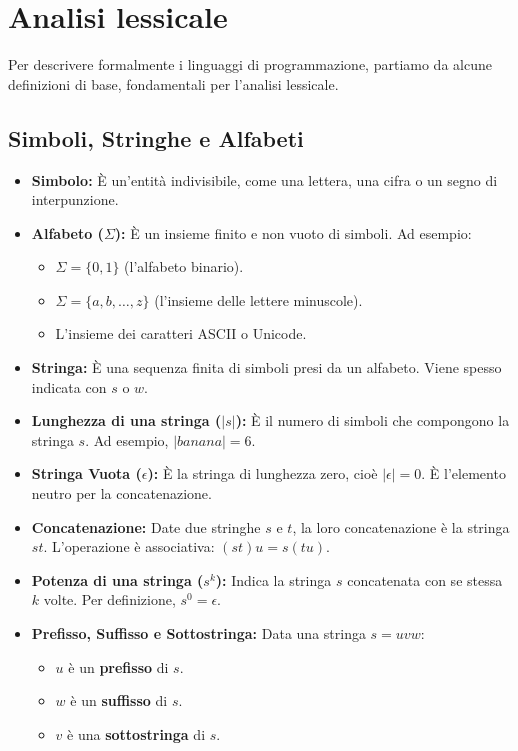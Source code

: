 \section{Analisi lessicale}

Per descrivere formalmente i linguaggi di programmazione, partiamo da alcune definizioni di base, fondamentali per l'analisi lessicale.

\subsection{Simboli, Stringhe e Alfabeti}
\begin{itemize}
    \item \textbf{Simbolo:} È un'entità indivisibile, come una lettera, una cifra o un segno di interpunzione.
    \item \textbf{Alfabeto ($\Sigma$):} È un insieme finito e non vuoto di simboli. Ad esempio:
    \begin{itemize}
        \item $\Sigma = \{0, 1\}$ (l'alfabeto binario).
        \item $\Sigma = \{a, b, \dots, z\}$ (l'insieme delle lettere minuscole).
        \item L'insieme dei caratteri ASCII o Unicode.
    \end{itemize}
    \item \textbf{Stringa:} È una sequenza finita di simboli presi da un alfabeto. Viene spesso indicata con $s$ o $w$.
    \item \textbf{Lunghezza di una stringa ($|s|$):} È il numero di simboli che compongono la stringa $s$. Ad esempio, $|banana| = 6$.
    \item \textbf{Stringa Vuota ($\epsilon$):} È la stringa di lunghezza zero, cioè $|\epsilon| = 0$. È l'elemento neutro per la concatenazione.
    \item \textbf{Concatenazione:} Date due stringhe $s$ e $t$, la loro concatenazione è la stringa $st$. L'operazione è associativa: $(st)u = s(tu)$.
    \item \textbf{Potenza di una stringa ($s^k$):} Indica la stringa $s$ concatenata con se stessa $k$ volte. Per definizione, $s^0 = \epsilon$.
    \item \textbf{Prefisso, Suffisso e Sottostringa:} Data una stringa $s=uvw$:
    \begin{itemize}
        \item $u$ è un \textbf{prefisso} di $s$.
        \item $w$ è un \textbf{suffisso} di $s$.
        \item $v$ è una \textbf{sottostringa} di $s$.
    \end{itemize}
\end{itemize}

